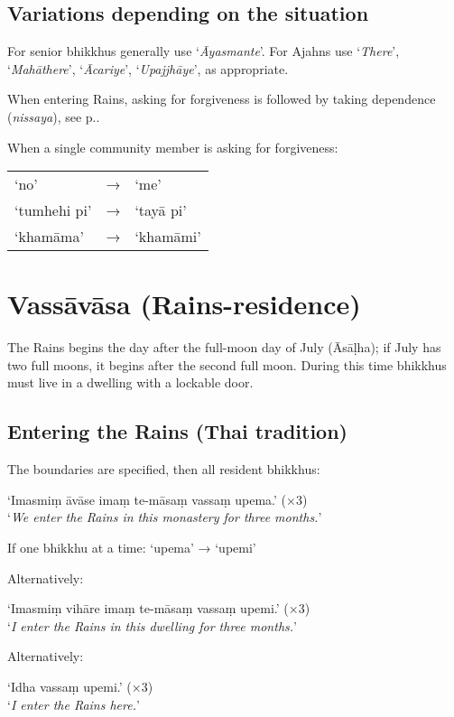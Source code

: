 \subsection*{Variations depending on the situation}

For senior bhikkhus generally use ‘\emph{Āyasmante}’. For Ajahns use ‘\emph{There}’,
‘\emph{Mahāthere}’, ‘\emph{Ācariye}’, ‘\emph{Upajjhāye}’, as appropriate.

When entering Rains, asking for forgiveness is followed by taking dependence
(\emph{nissaya}), see p.\pageref{nissaya}.

When a single community member is asking for forgiveness:

\begin{tabular}{@{}lll@{}}
‘no’ & → & ‘me’\\
‘tumhehi pi’ & → & ‘tayā pi’\\
‘khamāma’ & → & ‘khamāmi’\\
\end{tabular}

\section{Vassāvāsa (Rains-residence)}

The Rains begins the day after the full-moon day of July (Āsāḷha); if July has two full
moons, it begins after the second full moon. During this time bhikkhus must live
in a dwelling with a lockable door.

\subsection{Entering the Rains (Thai tradition)}

The boundaries are specified, then all resident bhikkhus:

‘Imasmiṃ āvāse imaṃ te-māsaṃ vassaṃ upema.’ (×3)\\
‘\emph{We enter the Rains in this monastery for three months.}’

If one bhikkhu at a time: ‘upema’ → ‘upemi’

\ifhandbookedition
\enlargethispage{\baselineskip}
\fi

Alternatively:

‘Imasmiṃ vihāre imaṃ te-māsaṃ vassaṃ upemi.’ (×3)\\
‘\emph{I enter the Rains in this dwelling for three months.}’

Alternatively:

‘Idha vassaṃ upemi.’ (×3)\\
‘\emph{I enter the Rains here.}’ 

